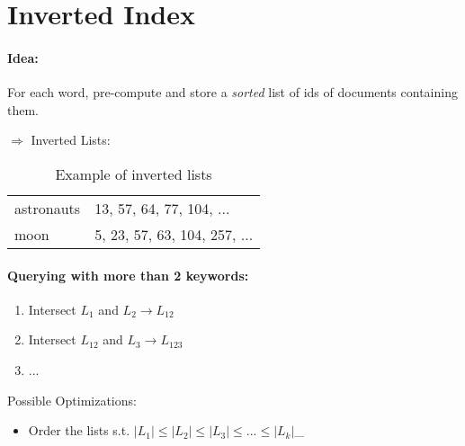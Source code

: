 \documentclass[a4paper]{scrartcl}
\begin{document}
\section{Inverted Index}
\paragraph{Idea:} For each word, pre-compute and store a \emph{sorted} list of
ids of documents containing them.

$\Rightarrow$ Inverted Lists:
\begin{table}[!htbp]
  \centering
  \caption{Example of inverted lists}
  \label{tab:inverted_list}
  \begin{tabular}{ll}
  astronauts& 13, 57, 64, 77, 104, ... \\
  moon & 5, 23, 57, 63, 104, 257, ...
  \end{tabular}
\end{table}


\paragraph{Querying with more than 2 keywords:}
\begin{enumerate}
\item Intersect $L_1$ and $L_2\rightarrow L_{12}$
\item Intersect $L_{12}$ and $L_3\rightarrow L_{123}$
\item ...
\end{enumerate}
Possible Optimizations:
\begin{itemize}
\item Order the lists s.t. $|L_1|\le|L_2|\le|L_3|\le...\le|L_k|$_
\end{itemize}
\end{document}
